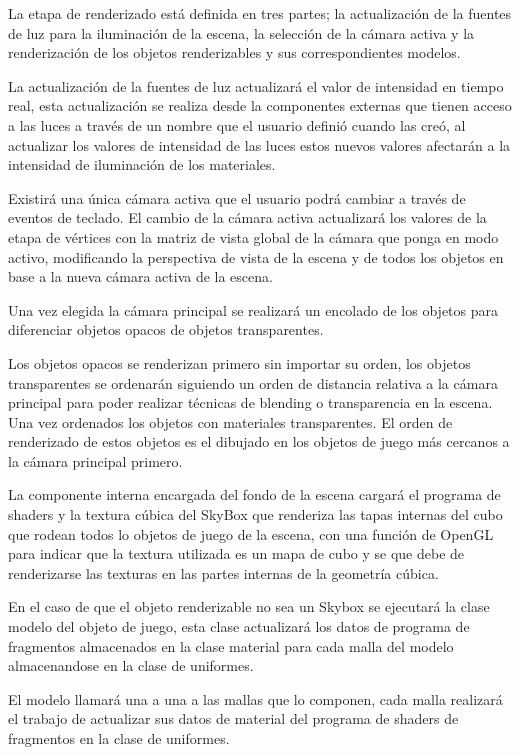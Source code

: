 \documentclass[a4paper, 17pt]{book}
\begin{document}
La etapa de renderizado está definida en tres partes; la actualización de la fuentes de luz para la iluminación de la escena,
la selección de la cámara activa y la renderización de los objetos renderizables y sus correspondientes modelos.

La actualización de la fuentes de luz actualizará el valor de intensidad en tiempo real, esta actualización se realiza desde
la componentes externas que tienen acceso a las luces a través de un nombre que el usuario definió cuando las creó, al
actualizar los valores de intensidad de las luces estos nuevos valores afectarán a la intensidad de iluminación de los materiales. 

Existirá una única cámara activa que el usuario podrá cambiar a través de eventos de teclado. El cambio de la cámara activa
actualizará los valores de la etapa de vértices con la matriz de vista global de la cámara que ponga en modo activo,
modificando la perspectiva de vista de la escena y de todos los objetos en base a la nueva cámara activa de la escena.

Una vez elegida la cámara principal se realizará un encolado de los objetos para diferenciar objetos opacos de objetos transparentes. 

Los objetos opacos se renderizan primero sin importar su orden, los objetos transparentes se ordenarán siguiendo un orden
de distancia relativa a la cámara principal para poder realizar técnicas de blending o transparencia en la escena. Una vez
ordenados los objetos con materiales transparentes. El orden de renderizado de estos objetos es el dibujado en los objetos
de juego más cercanos a la cámara principal primero.

La componente interna encargada del fondo de la escena cargará el programa de shaders y la textura cúbica del SkyBox
que renderiza las tapas internas del cubo que rodean todos lo objetos de juego de la escena, con una función de OpenGL
para indicar que la textura utilizada es un mapa de cubo y se que debe de renderizarse las texturas en las partes
internas de la geometría cúbica.

En el caso de que el objeto renderizable no sea un Skybox se ejecutará la clase modelo del objeto de juego, esta clase
actualizará los datos de programa de fragmentos almacenados en la clase material para cada malla del modelo almacenandose
en la clase de uniformes.

El modelo llamará una a una a las mallas que lo componen, cada malla realizará el trabajo de actualizar sus datos de material
del programa de shaders de fragmentos en la clase de uniformes.
\end{document}
